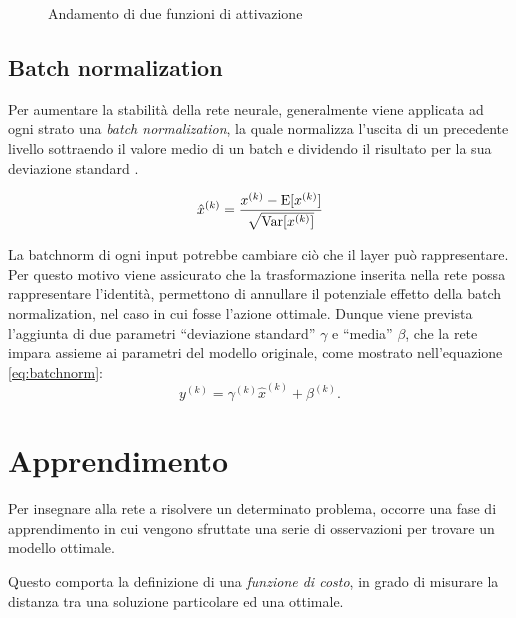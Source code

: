 \begin{figure}[htb]
	\centering
	\quad
	
	\caption{Andamento di due funzioni di attivazione}
	\label{fig:subfig}
\end{figure}


\subsection{Batch normalization}
\label{subsec:normalization}

Per aumentare la stabilità della rete neurale, generalmente viene applicata ad ogni strato una \emph{batch normalization}, la quale normalizza l'uscita di un precedente livello sottraendo il valore medio di un batch e dividendo il risultato per la sua deviazione standard \cite{ioffe2015batch}.

\begin{equation}
	\hat{x}^{(k)}=\frac{x^{(k)}-\operatorname{E}[x^{(k)}]}{\sqrt{\operatorname{Var}[x^{(k)}]}}
\end{equation}

La batchnorm di ogni input potrebbe cambiare ciò che il layer può rappresentare. Per questo motivo viene assicurato che la trasformazione inserita nella rete possa rappresentare l'identità, permettono di annullare il potenziale effetto della batch normalization, nel caso in cui fosse l'azione ottimale.
Dunque viene prevista l'aggiunta di due parametri  ``deviazione standard'' $\gamma$ e ``media'' $\beta$, che la rete impara assieme ai parametri del modello originale, come mostrato nell'equazione \ref{eq:batchnorm}:
\begin{equation}
	y^{(k)}=\gamma^{(k)}\hat{x}^{(k)}+\beta^{(k)}\mbox{.}
	\label{eq:batchnorm}
\end{equation}


\section{Apprendimento}
\label{sec:apprendimento}
Per insegnare alla rete a risolvere un determinato problema, occorre una fase di apprendimento in cui vengono sfruttate una serie di osservazioni per trovare un modello ottimale.

Questo comporta la definizione di una \emph{funzione di costo}, in grado di misurare la distanza tra una soluzione particolare ed una ottimale. 

